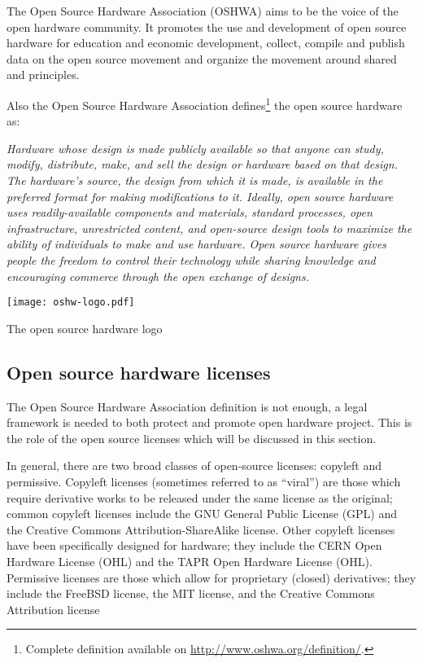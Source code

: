 The Open Source Hardware Association (OSHWA) aims to be the voice of the open hardware community. It promotes the use and development of open source hardware for education and economic development, collect, compile and publish data on the open source movement and organize the movement around shared and principles.

Also the Open Source Hardware Association defines\footnote{Complete definition available on \url{http://www.oshwa.org/definition/}.} the open source hardware as:

\begin{row}{4}{2}
    \begin{cell}{3}
        \emph{Hardware whose design is made publicly available so that anyone can study, modify, distribute, make, and sell the design or hardware based on that design. The hardware’s source, the design from which it is made, is available in the preferred format for making modifications to it. Ideally, open source hardware uses readily-available components and materials, standard processes, open infrastructure, unrestricted content, and open-source design tools to maximize the ability of individuals to make and use hardware. Open source hardware gives people the freedom to control their technology while sharing knowledge and encouraging commerce through the open exchange of designs.}
    \end{cell}
    \begin{cell}{1}
        \begin{NFfigure}
            \centering
                \texttt{[image: oshw-logo.pdf]}
            \caption{The open source hardware logo}
            \label{fig:ohw-logo}
        \end{NFfigure}
    \end{cell}
\end{row}


\subsection{Open source hardware licenses} %

The Open Source Hardware Association definition is not enough, a legal framework is needed to both protect and promote open hardware project. This is the role of the open source licenses which will be discussed in this section.

In general, there are two broad classes of open-source licenses: copyleft and permissive. Copyleft licenses (sometimes referred to as “viral”) are those which require derivative works to be released under the same license as the original; common copyleft licenses include the GNU General Public License (GPL) and the Creative Commons Attribution-ShareAlike license. Other copyleft licenses have been specifically designed for hardware; they include the CERN Open Hardware License (OHL) and the TAPR Open Hardware License (OHL). Permissive licenses are those which allow for proprietary (closed) derivatives; they include the FreeBSD license, the MIT license, and the Creative Commons Attribution license


